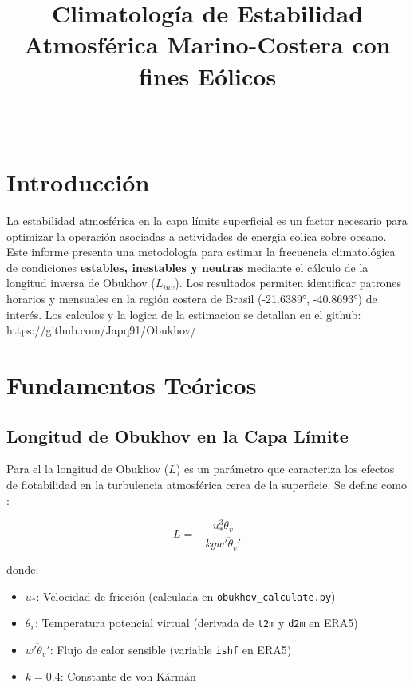 \documentclass[11pt]{article}
\title{Climatología de Estabilidad Atmosférica Marino-Costera con fines Eólicos}
\author{--}
\begin{document}
\maketitle

\section{Introducción}
La estabilidad atmosférica en la capa límite superficial es un factor necesario para optimizar la operación asociadas a actividades de energia eolica sobre oceano. Este informe presenta una metodología para estimar la frecuencia climatológica de condiciones \textbf{estables, inestables y neutras} mediante el cálculo de la longitud inversa de Obukhov (\(L_{inv}\)). Los resultados permiten identificar patrones horarios y mensuales en la región costera de Brasil (-21.6389°, -40.8693°) de interés. Los calculos y la logica de la estimacion se detallan en el github: https://github.com/Japq91/Obukhov/ 
\section{Fundamentos Teóricos}
\subsection{Longitud de Obukhov en la Capa Límite}
Para el \citep{ecmwf_ifs_cy49r1_physics} la longitud de Obukhov ($L$) es un parámetro que caracteriza los efectos de flotabilidad en la turbulencia atmosférica cerca de la superficie. Se define como :

\begin{equation}
L = -\frac{u_*^3 \theta_v}{k g \overline{w'\theta_v'}}
\end{equation}

donde:
\begin{itemize}
    \item $u_*$: Velocidad de fricción (calculada en \texttt{obukhov\_calculate.py})
    \item $\theta_v$: Temperatura potencial virtual (derivada de \texttt{t2m} y \texttt{d2m} en ERA5)
    \item $\overline{w'\theta_v'}$: Flujo de calor sensible (variable \texttt{ishf} en ERA5)
    \item $k = 0.4$: Constante de von Kármán
\end{itemize}
\end{document}
